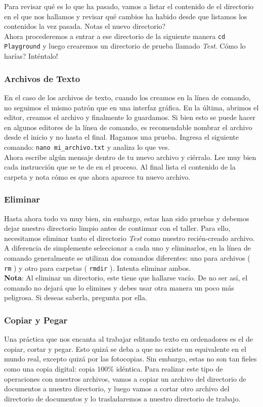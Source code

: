 \documentclass[10pt,letterpaper]{article}
\newcommand{\inlinecode}[1]{
\colorbox{light-gray}{\texttt{#1}}
}
\begin{document}
Para revisar qu\'e es lo que ha pasado, vamos a listar el contenido de el directorio en el que nos hallamos y revisar qu\'e cambios ha habido desde que listamos los contenidos la vez pasada. Notas el nuevo directorio?\\

Ahora procederemos a entrar a ese directorio de la siguiente manera \inlinecode{cd Playground} y luego crearemos un directorio de prueba llamado \emph{Test}. C\'omo lo har\'ias? Int\'entalo!

\subsubsection{Archivos de Texto}
En el caso de los archivos de texto, cuando los creamos en la l\'inea de comando, no seguimos el mismo patr\'on que en una interfaz gr\'afica. En la \'ultima, abrimos el editor, creamos el archivo y finalmente lo guardamos. Si bien esto se puede hacer en algunos editores de la l\'inea de comando, es recomendable nombrar el archivo desde el inicio y no hasta el final. Hagamos una prueba. Ingresa el siguiente comando: \inlinecode{nano mi\_archivo.txt} y analiza lo que ves.\\

Ahora escribe alg\'un mensaje dentro de tu nuevo archivo y ci\'erralo. Lee muy bien cada instrucci\'on que se te de en el proceso. Al final lista el contenido de la carpeta y nota c\'omo es que ahora aparece tu nuevo archivo.

\subsubsection{Eliminar}
Hasta ahora todo va muy bien, sin embargo, estas han sido pruebas y debemos dejar nuestro directorio limpio antes de continuar con el taller. Para ello, necesitamos eliminar tanto el directorio \emph{Test} como nuestro reci\'en-creado archivo. A diferencia de simplemente seleccionar a cada uno y eliminarlos, en la l\'inea de comando generalmente se utilizan dos comandos diferentes: uno para archivos (\inlinecode{rm}) y otro para carpetas (\inlinecode{rmdir}). Intenta eliminar ambos.\\

\textbf{Nota}: Al eliminar un directorio, este tiene que hallarse vac\'io. De no ser as\'i, el comando no dejar\'a que lo elimines y debes usar otra manera un poco m\'as peligrosa. Si deseas saberla, pregunta por ella.

\subsubsection{Copiar y Pegar}
Una pr\'actica que nos encanta al trabajar editando texto en ordenadores es el de copiar, cortar y pegar. Esto quiz\'a se deba a que no existe un equivalente en el mundo real, excepto quiz\'a por las fotocopias. Sin embargo, estas no son tan fieles como una copia digital: copia $100\%$ id\'entica. Para realizar este tipo de operaciones con nuestros archivos, vamos a copiar un archivo del directorio de documentos a nuestro directorio, y luego vamos a cortar otro archivo del directorio de documentos y lo trasladaremos a nuestro directorio de trabajo.\\
\end{document}
